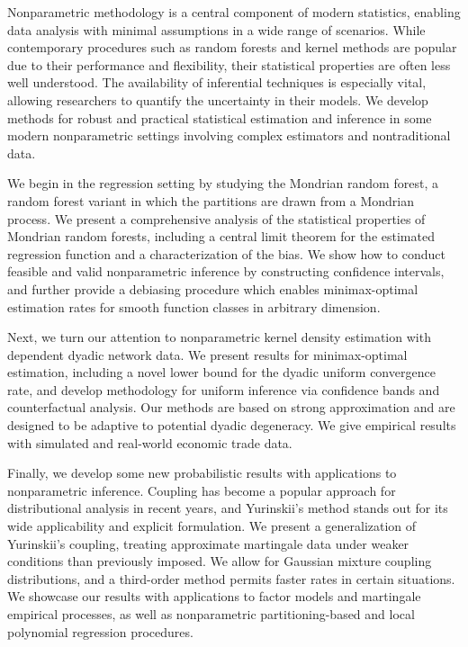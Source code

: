 

Nonparametric methodology is a central component of modern statistics, enabling
data analysis with minimal assumptions in a wide range of scenarios.
While contemporary procedures such as random forests and kernel
methods are popular due to their performance and flexibility, their
statistical properties are often less well understood.
The availability of inferential techniques is especially vital,
allowing researchers to quantify the uncertainty in their models.
We develop methods for robust and practical statistical estimation and
inference in some modern nonparametric settings involving complex estimators
and nontraditional data.

We begin in the regression setting by studying the Mondrian random forest, a
random forest variant in which the partitions are drawn from a Mondrian
process. We
present a comprehensive analysis of the statistical properties of Mondrian
random forests, including a central limit theorem for the estimated regression
function and a characterization of the bias. We show how to conduct feasible
and valid nonparametric inference by constructing confidence intervals, and
further provide a debiasing procedure which enables minimax-optimal estimation
rates for smooth function classes in arbitrary dimension.

Next, we turn our attention to nonparametric kernel density estimation with
dependent dyadic network data. We present results for minimax-optimal
estimation, including a novel lower bound for the dyadic uniform convergence
rate, and develop methodology for uniform inference via confidence bands and
counterfactual analysis. Our methods are based on strong approximation and are
designed to be adaptive to potential dyadic degeneracy. We give empirical
results with simulated and real-world economic trade data.

Finally, we develop some new probabilistic results with applications to
nonparametric inference. Coupling has become a popular approach for
distributional analysis in recent years, and Yurinskii's method stands out
for its wide applicability and explicit formulation. We present a
generalization of Yurinskii's coupling, treating approximate martingale data
under weaker conditions than previously imposed. We allow for Gaussian mixture
coupling distributions, and a third-order method permits faster rates in certain
situations. We showcase our results with applications to factor models and
martingale empirical processes, as well as nonparametric partitioning-based and
local polynomial regression procedures.
